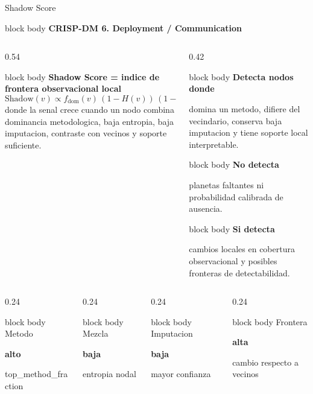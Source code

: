 \documentclass[aspectratio=169,10pt]{beamer}
\newcommand{\phasebar}[1]{
  \begin{beamercolorbox}[wd=\linewidth,sep=0.24em,rounded=true]{block body}
    {\scriptsize\color{accent}\bfseries CRISP-DM \hspace{0.6em}\color{textmuted}#1}
  \end{beamercolorbox}
}
\newcommand{\statcard}[3]{
  \begin{beamercolorbox}[wd=\linewidth,sep=0.34em,rounded=true]{block body}
    {\scriptsize\color{textmuted}#1}\par
    {\fontsize{16}{17}\selectfont\bfseries #2}\par
    {\scriptsize #3}
  \end{beamercolorbox}
}
\newcommand{\infocard}[2]{
  \begin{beamercolorbox}[wd=\linewidth,sep=0.38em,rounded=true]{block body}
    {\small\bfseries #1}\par
    \vspace{0.04em}
    {\scriptsize #2}
  \end{beamercolorbox}
}
\begin{document}
\begin{frame}[t]{Shadow Score}
  \phasebar{6. Deployment / Communication}
  \vspace{0.08cm}
  \begin{columns}[T,onlytextwidth]
    \begin{column}{0.54\textwidth}
      \begin{beamercolorbox}[wd=\linewidth,sep=0.60em,rounded=true]{block body}
        {\small\bfseries Shadow Score = indice de frontera observacional local}
        \[
        \mathrm{Shadow}(v)\propto f_{\mathrm{dom}}(v)\,(1-H(v))\,(1-I(v))\,B(v)\,S(v)
        \]
        {\scriptsize donde la senal crece cuando un nodo combina dominancia metodologica, baja entropia, baja imputacion, contraste con vecinos y soporte suficiente.}
      \end{beamercolorbox}
    \end{column}
    \begin{column}{0.42\textwidth}
      \infocard{Detecta nodos donde}{domina un metodo, difiere del vecindario, conserva baja imputacion y tiene soporte local interpretable.}
      \vspace{0.08cm}
      \infocard{No detecta}{planetas faltantes ni probabilidad calibrada de ausencia.}
      \vspace{0.08cm}
      \infocard{Si detecta}{cambios locales en cobertura observacional y posibles fronteras de detectabilidad.}
    \end{column}
  \end{columns}
  \vspace{0.12cm}
  \begin{columns}[T,onlytextwidth]
    \begin{column}{0.24\textwidth}
      \statcard{Metodo}{alto}{top\_method\_fraction}
    \end{column}
    \begin{column}{0.24\textwidth}
      \statcard{Mezcla}{baja}{entropia nodal}
    \end{column}
    \begin{column}{0.24\textwidth}
      \statcard{Imputacion}{baja}{mayor confianza}
    \end{column}
    \begin{column}{0.24\textwidth}
      \statcard{Frontera}{alta}{cambio respecto a vecinos}
    \end{column}
  \end{columns}
\end{frame}
\end{document}
